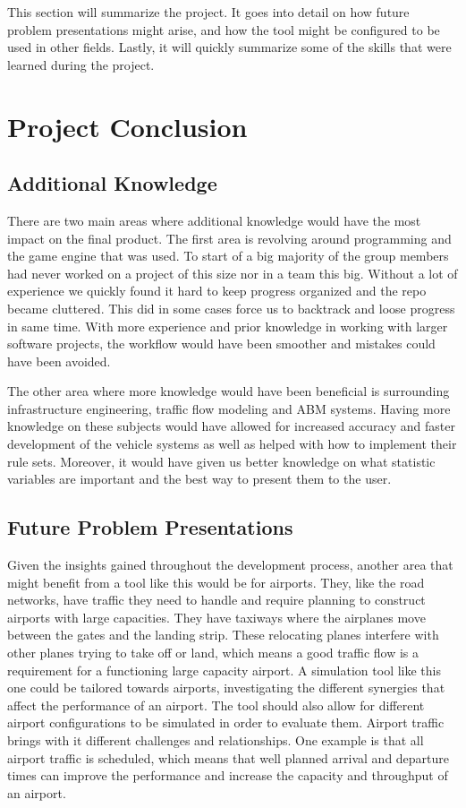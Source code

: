 This section will summarize the project. It goes into detail on how future problem presentations might arise, and how the tool might be configured to be used in other fields. Lastly, it will quickly summarize some of the skills that were learned during the project.

\section{Project Conclusion}
    \subsection{Additional Knowledge}
        There are two main areas where additional knowledge would have the most impact on the final product. The first area is revolving around programming and the game engine that was used. To start of a big majority of the group members had never worked on a project of this size nor in a team this big. Without a lot of experience we quickly found it hard to keep progress organized and the repo became cluttered. This did in some cases force us to backtrack and loose progress in same time. With more experience and prior knowledge in working with larger software projects, the workflow would have been smoother and mistakes could have been avoided.

        The other area where more knowledge would have been beneficial is surrounding infrastructure engineering, traffic flow modeling and ABM systems. Having more knowledge on these subjects would have allowed for increased accuracy and faster development of the vehicle systems as well as helped with how to implement their rule sets. Moreover, it would have given us better knowledge on what statistic variables are important and the best way to present them to the user.

    \subsection{Future Problem Presentations}
        Given the insights gained throughout the development process, another area that might benefit from a tool like this would be for airports. They, like the road networks, have traffic they need to handle and require planning to construct airports with large capacities. They have taxiways where the airplanes move between the gates and the landing strip. These relocating planes interfere with other planes trying to take off or land, which means a good traffic flow is a requirement for a functioning large capacity airport. A simulation tool like this one could be tailored towards airports, investigating the different synergies that affect the performance of an airport. The tool should also allow for different airport configurations to be simulated in order to evaluate them. Airport traffic brings with it different challenges and relationships. One example is that all airport traffic is scheduled, which means that well planned arrival and departure times can improve the performance and increase the capacity and throughput of an airport.

